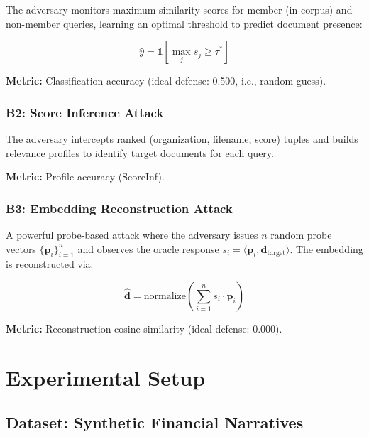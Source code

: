 \documentclass[conference]{IEEEtran}
\begin{document}
The adversary monitors maximum similarity scores for member (in-corpus) and non-member queries, learning an optimal threshold to predict document presence:

\begin{equation}
    \hat{y} = \mathbb{1}[\max_j s_j \geq \tau^*]
\end{equation}

\textbf{Metric:} Classification accuracy (ideal defense: 0.500, i.e., random guess).

\subsubsection{B2: Score Inference Attack}

The adversary intercepts ranked (organization, filename, score) tuples and builds relevance profiles to identify target documents for each query.

\textbf{Metric:} Profile accuracy (ScoreInf).

\subsubsection{B3: Embedding Reconstruction Attack}

A powerful probe-based attack where the adversary issues $n$ random probe vectors $\{\mathbf{p}_i\}_{i=1}^{n}$ and observes the oracle response $s_i = \langle \mathbf{p}_i, \mathbf{d}_{\text{target}} \rangle$. The embedding is reconstructed via:

\begin{equation}
    \hat{\mathbf{d}} = \text{normalize}\left(\sum_{i=1}^{n} s_i \cdot \mathbf{p}_i\right)
\end{equation}

\textbf{Metric:} Reconstruction cosine similarity (ideal defense: 0.000).

\section{Experimental Setup}
\label{sec:setup}

\subsection{Dataset: Synthetic Financial Narratives}
\end{document}
